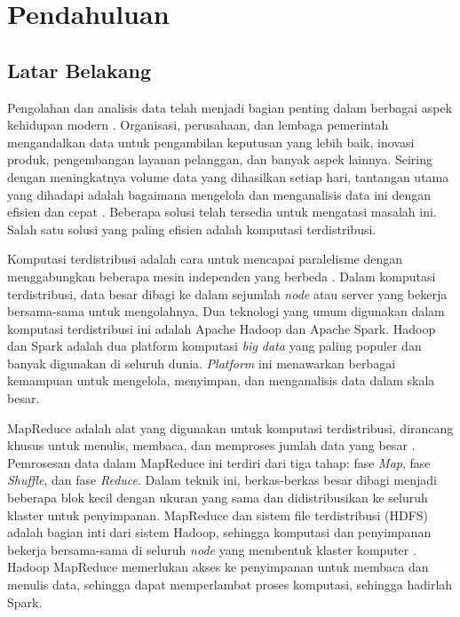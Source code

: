 \chapter{Pendahuluan}

\pagestyle{plain}

\section{Latar Belakang}

Pengolahan dan analisis data telah menjadi bagian penting dalam berbagai aspek kehidupan modern \cite{vermaBigDataManagement2016}. Organisasi, perusahaan, dan lembaga pemerintah mengandalkan data untuk pengambilan keputusan yang lebih baik, inovasi produk, pengembangan layanan pelanggan, dan banyak aspek lainnya. Seiring dengan meningkatnya volume data yang dihasilkan setiap hari, tantangan utama yang dihadapi adalah bagaimana mengelola dan menganalisis data ini dengan efisien dan cepat \cite{ahmadvandGapproxUsingGallup2019}. Beberapa solusi telah tersedia untuk mengatasi masalah ini. Salah satu solusi yang paling efisien adalah komputasi terdistribusi. 

Komputasi terdistribusi adalah cara untuk mencapai paralelisme dengan menggabungkan beberapa mesin independen yang berbeda \cite{bhattacharyaEvaluatingDistributedComputing2021}. Dalam komputasi terdistribusi, data besar dibagi ke dalam sejumlah \textit{node} atau server yang bekerja bersama-sama untuk mengolahnya. Dua teknologi yang umum digunakan dalam komputasi terdistribusi ini adalah Apache Hadoop dan Apache Spark. Hadoop dan Spark adalah dua platform komputasi \textit{big data} yang paling populer dan banyak digunakan di seluruh dunia. \textit{Platform} ini menawarkan berbagai kemampuan untuk mengelola, menyimpan, dan menganalisis data dalam skala besar. 

MapReduce adalah alat yang digunakan untuk komputasi terdistribusi, dirancang khusus untuk menulis, membaca, dan memproses jumlah data yang besar \cite{deanMapReduceSimplifiedData2004}. Pemrosesan data dalam MapReduce ini terdiri dari tiga tahap: fase \textit{Map}, fase \textit{Shuffle}, dan fase \textit{Reduce}. Dalam teknik ini, berkas-berkas besar dibagi menjadi beberapa blok kecil dengan ukuran yang sama dan didistribusikan ke seluruh klaster untuk penyimpanan. MapReduce dan sistem file terdistribusi (HDFS) adalah bagian inti dari sistem Hadoop, sehingga komputasi dan penyimpanan bekerja bersama-sama di seluruh \textit{node} yang membentuk klaster komputer \cite{samadiComparativeStudyHadoop2016}. Hadoop MapReduce memerlukan akses ke penyimpanan untuk membaca dan menulis data, sehingga dapat memperlambat proses komputasi, sehingga hadirlah Spark.

